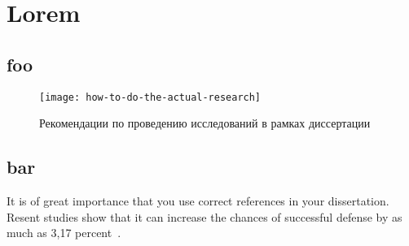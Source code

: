\chapter{Lorem}

\section{foo}

\blindtext

\begin{figure}[htbp]
\centering
\texttt{[image: how-to-do-the-actual-research]}
\caption{Рекомендации по проведению исследований в рамках диссертации}%
\label{fig:how-to-do-research}
\end{figure}

\Blindtext

\section{bar}

\blindtext
It is of great importance that you use correct references in your dissertation.
Resent studies show that it can increase the chances of successful defense
by as much as 3,17 percent~\cite{big,small,russian}.

\Blindtext
